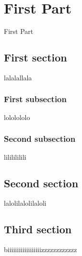 \chapter{First Part}
First Part

\section{First section}
lalalallala
\subsection{First subsection}
lololololo
\subsection{Second subsection}
lililililili
\section{Second section}
lalolilalolilaloli
\section{Third section}
biiiiiiiiiiiiiiiiiizzzzzzzzzzzz